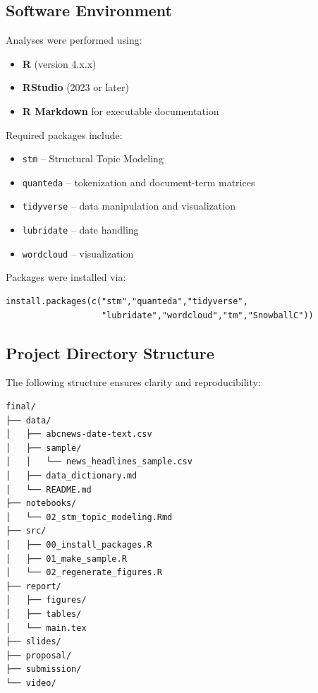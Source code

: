 \documentclass[11pt]{article}
\begin{document}
\subsection{Software Environment}

Analyses were performed using:
\begin{itemize}
    \item \textbf{R} (version 4.x.x)
    \item \textbf{RStudio} (2023 or later)
    \item \textbf{R Markdown} for executable documentation
\end{itemize}

Required packages include:
\begin{itemize}
    \item \texttt{stm} -- Structural Topic Modeling
    \item \texttt{quanteda} -- tokenization and document-term matrices
    \item \texttt{tidyverse} -- data manipulation and visualization
    \item \texttt{lubridate} -- date handling
    \item \texttt{wordcloud} -- visualization
\end{itemize}

Packages were installed via:

\begin{verbatim}
install.packages(c("stm","quanteda","tidyverse",
                   "lubridate","wordcloud","tm","SnowballC"))
\end{verbatim}

\subsection{Project Directory Structure}

The following structure ensures clarity and reproducibility:

\begin{verbatim}
final/
├── data/
│   ├── abcnews-date-text.csv
│   ├── sample/
│   │   └── news_headlines_sample.csv
│   ├── data_dictionary.md
│   └── README.md
├── notebooks/
│   └── 02_stm_topic_modeling.Rmd
├── src/
│   ├── 00_install_packages.R
│   ├── 01_make_sample.R
│   └── 02_regenerate_figures.R
├── report/
│   ├── figures/
│   ├── tables/
│   └── main.tex
├── slides/
├── proposal/
├── submission/
└── video/
\end{verbatim}

\end{document}
